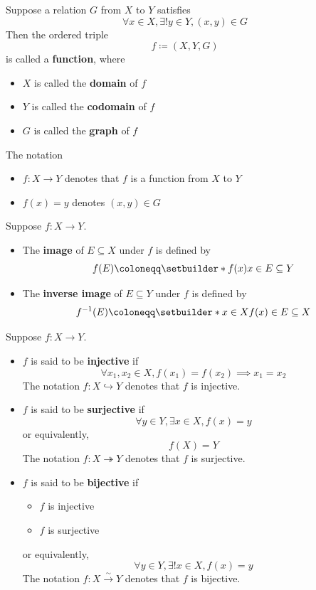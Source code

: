 \begin{definition} \label{an1:def:function}
  Suppose a relation $G$ from $X$ to $Y$ satisfies
  \[
    \forall x \in X, \exists! y \in Y, (x, y) \in G
  \]
  Then the ordered triple
  \[
    f \coloneqq (X, Y, G)
  \]
  is called a \textbf{function}, where
  \begin{itemize}
    \item $X$ is called the \textbf{domain} of $f$
    \item $Y$ is called the \textbf{codomain} of $f$
    \item $G$ is called the \textbf{graph} of $f$
  \end{itemize}
  The notation
  \begin{itemize}
    \item $f:X \to Y$ denotes that $f$ is a function from $X$ to $Y$
    \item $f(x) = y$ denotes $(x, y)\in G$
  \end{itemize}
\end{definition}

\begin{definition} \label{an1:def:image-inverse-image}
  Suppose $f: X \to Y$.
  \begin{itemize}
    \item The \textbf{image} of $E \subseteq X$ under $f$ is defined by
          \[
            f(E) \coloneqq \setbuilder*{f(x)}{x \in E} \subseteq Y
          \]
    \item The \textbf{inverse image} of $E \subseteq Y$ under $f$ is defined by
          \[
            f^{-1}(E) \coloneqq \setbuilder*{x \in X}{f(x) \in E} \subseteq X
          \]
  \end{itemize}
\end{definition}

\begin{definition} \label{an1:def:injective-surjective-bijective}
  Suppose $f: X \to Y$.
  \begin{itemize}
    \item $f$ is said to be \textbf{injective} if
          \[
            \forall x_{1}, x_{2} \in X, f(x_{1}) = f(x_{2}) \implies x_{1} = x_{2}
          \]
          The notation $f: X \hookrightarrow Y$ denotes that $f$ is injective.
    \item $f$ is said to be \textbf{surjective} if
          \[
            \forall y \in Y, \exists x \in X, f(x) = y
          \]
          or equivalently,
          \[
            f(X) = Y
          \]
          The notation $f: X \twoheadrightarrow Y$ denotes that $f$ is surjective.
    \item $f$ is said to be \textbf{bijective} if
          \begin{itemize}
            \item $f$ is injective
            \item $f$ is surjective
          \end{itemize}
          or equivalently,
          \[
            \forall y \in Y, \exists! x \in X, f(x) = y
          \]
          The notation $f: X \xrightarrow{\sim} Y$ denotes that $f$ is bijective.
  \end{itemize}
\end{definition}

